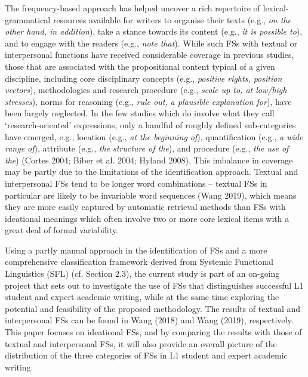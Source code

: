 \documentclass[12pt]{article}
\newenvironment{styleStandard}{\setlength\leftskip{0cm}\setlength\rightskip{0cm plus 1fil}\setlength\parindent{0cm}\setlength\parfillskip{0pt plus 1fil}\setlength\parskip{0cm plus 1pt}\writerlistparindent\writerlistleftskip\leavevmode\normalfont\normalsize\writerlistlabel\ignorespaces}{\unskip\vspace{0cm plus 1pt}\par}
\newcommand\writerlistleftskip{}
\newcommand\writerlistparindent{}
\newcommand\writerlistlabel{}
\begin{document}
\begin{styleStandard}
The frequency-based approach has helped uncover a rich repertoire of lexical-grammatical resources available for writers to organise their texts (e.g., \textit{on the other hand, in addition}), take a stance towards its content (e.g., \textit{it is possible to}), and to engage with the readers (e.g., \textit{note that}). While such FSs with textual or interpersonal functions have received considerable coverage in previous studies, those that are associated with the propositional content typical of a given discipline, including core disciplinary concepts (e.g., \textit{positive rights, position vectors}), methodologies and research procedure (e.g., \textit{scale up to, at low/high stresses}), norms for reasoning (e.g., \textit{rule out, a plausible explanation for}), have been largely neglected. In the few studies which do involve what they call ‘research-oriented’ expressions, only a handful of roughly defined sub-categories have emerged, e.g., location (e.g., \textit{at the beginning of}), quantification (e.g., \textit{a wide range of}), attribute (e.g., \textit{the structure of the}), and procedure (e.g., \textit{the use of the}) (Cortes 2004; Biber et al. 2004; Hyland 2008). This imbalance in coverage may be partly due to the limitations of the identification approach. Textual and interpersonal FSs tend to be longer word combinations – textual FSs in particular are likely to be invariable word sequences (Wang 2019), which means they are more easily captured by automatic retrieval methods than FSs with ideational meanings which often involve two or more core lexical items with a great deal of formal variability. 
\end{styleStandard}

\begin{styleStandard}
Using a partly manual approach in the identification of FSs and a more comprehensive classification framework derived from Systemic Functional Linguistics (SFL) (cf. Section 2.3), the current study is part of an on-going project that sets out to investigate the use of FSs that distinguishes successful L1 student and expert academic writing, while at the same time exploring the potential and feasibility of the proposed methodology. The results of textual and interpersonal FSs can be found in Wang (2018) and Wang (2019), respectively. This paper focuses on ideational FSs, and by comparing the results with those of textual and interpersonal FSs, it will also provide an overall picture of the distribution of the three categories of FSs in L1 student and expert academic writing.
\end{styleStandard}
\end{document}
